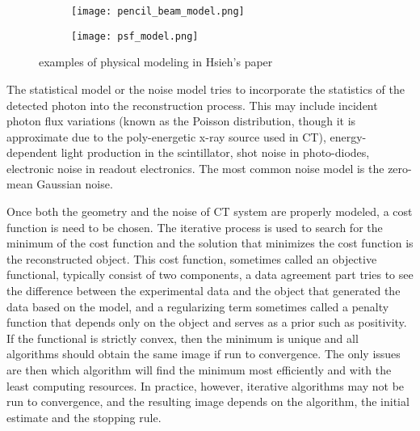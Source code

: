\begin{figure}

	\begin{subfigure}[b]{0.4\linewidth}

	\texttt{[image: pencil\_beam\_model.png]}	
	\end{subfigure}
\hspace{0.2cm}
	\begin{subfigure}[b]{0.4\linewidth}

	\texttt{[image: psf\_model.png]}
	\end{subfigure}
\caption{examples of physical modeling in Hsieh's paper}
\label{fig:physical_modeling}
\end{figure}

The statistical model or the noise model tries to incorporate the statistics of the detected photon into the reconstruction process.  This may include incident photon flux variations (known as the Poisson distribution, though it is approximate due to the poly-energetic x-ray source used in CT), energy-dependent light production in the scintillator, shot noise in photo-diodes, electronic noise in readout electronics. The most common noise model is the zero-mean Gaussian noise.

Once both the geometry and the noise of CT system are properly modeled, a cost function is need to be chosen.  The iterative process is used to search for the minimum of the cost function and the solution that minimizes the cost function is the reconstructed object.  This cost function, sometimes called an objective functional, typically consist of two components, a data agreement part tries to see the difference between the experimental data and the object that generated the data based on the model, and a regularizing term sometimes called a penalty function that depends only on the object and serves as a prior such as positivity.  If the functional is strictly convex, then the minimum is unique and all algorithms should obtain the same image if run to convergence.  The only issues are then which algorithm will find the minimum most efficiently and with the least computing resources.  In practice, however, iterative algorithms may not be run to convergence, and the resulting image depends on the algorithm, the initial estimate and the stopping rule.

